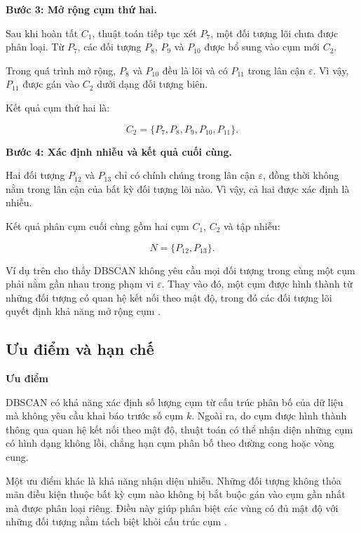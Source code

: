 \textbf{Bước 3: Mở rộng cụm thứ hai.}

Sau khi hoàn tất \(C_1\), thuật toán tiếp tục xét \(P_7\), một đối tượng lõi chưa được phân loại. Từ \(P_7\), các đối tượng \(P_8\), \(P_9\) và \(P_{10}\) được bổ sung vào cụm mới \(C_2\).

Trong quá trình mở rộng, \(P_8\) và \(P_{10}\) đều là lõi và có \(P_{11}\) trong lân cận \(\varepsilon\). Vì vậy, \(P_{11}\) được gán vào \(C_2\) dưới dạng đối tượng biên.

Kết quả cụm thứ hai là:

\begin{equation}
    C_2=\{P_7,P_8,P_9,P_{10},P_{11}\}.
\end{equation}

\textbf{Bước 4: Xác định nhiễu và kết quả cuối cùng.}

Hai đối tượng \(P_{12}\) và \(P_{13}\) chỉ có chính chúng trong lân cận \(\varepsilon\), đồng thời không nằm trong lân cận của bất kỳ đối tượng lõi nào. Vì vậy, cả hai được xác định là nhiễu.

Kết quả phân cụm cuối cùng gồm hai cụm \(C_1\), \(C_2\) và tập nhiễu:

\begin{equation}
    {N}=\{P_{12},P_{13}\}.
\end{equation}

Ví dụ trên cho thấy DBSCAN không yêu cầu mọi đối tượng trong cùng một cụm phải nằm gần nhau trong phạm vi \(\varepsilon\). Thay vào đó, một cụm được hình thành từ những đối tượng có quan hệ kết nối theo mật độ, trong đó các đối tượng lõi quyết định khả năng mở rộng cụm \parencite{ester1996dbscan}.

\subsection{Ưu điểm và hạn chế}

\textbf{Ưu điểm}

DBSCAN có khả năng xác định số lượng cụm từ cấu trúc phân bố của dữ liệu mà không yêu cầu khai báo trước số cụm \(k\). Ngoài ra, do cụm được hình thành thông qua quan hệ kết nối theo mật độ, thuật toán có thể nhận diện những cụm có hình dạng không lồi, chẳng hạn cụm phân bố theo đường cong hoặc vòng cung.

Một ưu điểm khác là khả năng nhận diện nhiễu. Những đối tượng không thỏa mãn điều kiện thuộc bất kỳ cụm nào không bị bắt buộc gán vào cụm gần nhất mà được phân loại riêng. Điều này giúp phân biệt các vùng có đủ mật độ với những đối tượng nằm tách biệt khỏi cấu trúc cụm \parencite{ester1996dbscan}.


